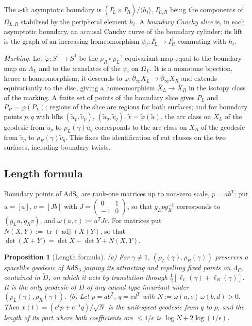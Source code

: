 \documentclass[aps,prd,onecolumn,superscriptaddress,nofootinbib,amsmath,amssymb,11pt]{revtex4-2}
\newtheorem{proposition}[theorem]{Proposition}
\theoremstyle{definition}
\newcommand{\AdS}{\mathrm{AdS}_3}
\newcommand{\eps}{\epsilon}
\newcommand{\Dt}{\tilde D}
\newcommand{\adj}{\operatorname{adj}}
\newcommand{\tr}{\operatorname{tr}}
\begin{document}
The $i$-th asymptotic boundary is $(I^i_L\times I^i_R)/\langle h_i\rangle$, $I^i_{L,R}$ being the components of
$\Omega_{L,R}$ stabilised by the peripheral element $h_i$. A \emph{boundary Cauchy slice} is, in each asymptotic
boundary, an acausal Cauchy curve of the boundary cylinder; its lift is the graph of an increasing homeomorphism
$\psi_i:I^i_L\to I^i_R$ commuting with $h_i$.

\emph{Marking.} Let $\tilde\varphi:S^1\to S^1$ be the $\rho_R\circ\rho_L^{-1}$-equivariant map equal to the boundary map
on $\Lambda_L$ and to the translates of the $\psi_i$ on $\Omega_L$. It is a monotone bijection, hence a homeomorphism;
it descends to $\varphi:\partial_\infty X_L\to\partial_\infty X_R$ and extends equivariantly to the disc, giving a
homeomorphism $\bar X_L\to\bar X_R$ in the isotopy class of the marking. A finite set of points of the boundary slice
gives $P_L$ and $P_R=\varphi(P_L)$; regions of the slice are regions for both surfaces; and for boundary points $p,q$
with lifts $(\tilde u_p,\tilde v_p)$, $(\tilde u_q,\tilde v_q)$, $\tilde v=\tilde\varphi(\tilde u)$, the arc class on $X_L$ of
the geodesic from $\tilde u_p$ to $\rho_L(\gamma)\tilde u_q$ corresponds to the arc class on $X_R$ of the geodesic from
$\tilde v_p$ to $\rho_R(\gamma)\tilde v_q$. This fixes the identification of cut classes on the two surfaces, including
boundary twists.

\subsection{Length formula}

Boundary points of $\AdS$ are rank-one matrices up to non-zero scale, $p=ab^T$; put $u=[a]$, $v=[Jb]$ with
$J=\begin{pmatrix}0&1\\-1&0\end{pmatrix}$, so that $g_Lpg_R^{-1}$ corresponds to $(g_Lu,g_Rv)$, and
$\omega(a,c):=a^TJc$. For matrices put $N(X,Y):=\tr(\adj(X)Y)$, so that $\det(X+Y)=\det X+\det Y+N(X,Y)$.

\begin{proposition}[Length formula]\label{prop:length}
(a) For $\gamma\ne1$, $(\rho_L(\gamma),\rho_R(\gamma))$ preserves a spacelike geodesic of $\AdS$ joining its attracting
and repelling fixed points on $\Lambda_\Gamma$, contained in $\Dt$, on which it acts by translation through
$\frac12[\ell_L(\gamma)+\ell_R(\gamma)]$. It is the only geodesic of $\Dt$ of any causal type invariant under
$(\rho_L(\gamma),\rho_R(\gamma))$.
(b) Let $p=ab^T$, $q=cd^T$ with $N:=\omega(a,c)\,\omega(b,d)>0$. Then $x(t)=(e^tp+e^{-t}q)/\sqrt N$ is the unit-speed
geodesic from $q$ to $p$, and the length of its part where both coefficients are $\le1/\eps$ is $\log N+2\log(1/\eps)$.
\end{proposition}
\end{document}

